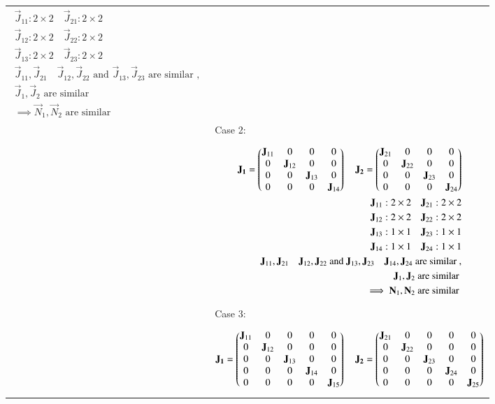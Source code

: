 \documentclass[journal,12pt]{IEEEtran}
\begin{document}
\begin{longtable}{|p{5cm}|p{13cm}|}
{\begin{align*}
    \vec{J}_{11}: 2\times2 \quad \vec{J}_{21}: 2\times2\\
    \vec{J}_{12}: 2\times2 \quad \vec{J}_{22}: 2\times2\\
    \vec{J}_{13}: 2\times2 \quad \vec{J}_{23}: 2\times2\\
    \vec{J}_{11}, \vec{J}_{21} \quad \vec{J}_{12}, \vec{J}_{22} \text{ and } \vec{J}_{13}, \vec{J}_{23} \text{ are similar }, \\
    \vec{J}_{1}, \vec{J}_{2} \text{ are similar }\\
    \implies \vec{N}_{1}, \vec{N}_{2} \text{ are similar }
\end{align*}}
\\& Case 2: 
\\&
\parbox{12cm}{\begin{align*}
    \mathbf{J_1}=\begin{pmatrix}\mathbf{J}_{11} & 0&0&0 \\ 0&\mathbf{J}_{12}&0&0\\0&0&\mathbf{J}_{13}&0\\0&0&0&\mathbf{J}_{14}\end{pmatrix} \quad \mathbf{J_2}=\begin{pmatrix}\mathbf{J}_{21} & 0&0&0 \\ 0&\mathbf{J}_{22}&0&0\\0&0&\mathbf{J}_{23}&0\\0&0&0&\mathbf{J}_{24}\end{pmatrix}\\
    \mathbf{J}_{11}: 2\times2 \quad \mathbf{J}_{21}: 2\times2\\
    \mathbf{J}_{12}: 2\times2 \quad \mathbf{J}_{22}: 2\times2\\
    \mathbf{J}_{13}: 1\times1 \quad \mathbf{J}_{23}: 1\times1\\
    \mathbf{J}_{14}: 1\times1 \quad \mathbf{J}_{24}: 1\times1\\
    \mathbf{J}_{11}, \mathbf{J}_{21}\quad \mathbf{J}_{12}, \mathbf{J}_{22}  \text{ and } \mathbf{J}_{13}, \mathbf{J}_{23} \quad \mathbf{J}_{14}, \mathbf{J}_{24} \text{ are similar }, \\
    \mathbf{J}_{1}, \mathbf{J}_{2} \text{ are similar }\\
    \implies \mathbf{N}_{1}, \mathbf{N}_{2} \text{ are similar }
\end{align*}}
\\& Case 3: 
\\&
\parbox{12cm}{\begin{align*}
    \vec{J_1}=\myvec{\vec{J}_{11} & 0&0&0&0 \\ 0&\vec{J}_{12}&0&0&0\\0&0&\vec{J}_{13}&0&0\\0&0&0&\vec{J}_{14}&0\\0&0&0&0&\vec{J}_{15}} \quad \vec{J_2}=\myvec{\vec{J}_{21} & 0&0&0&0 \\ 0&\vec{J}_{22}&0&0&0\\0&0&\vec{J}_{23}&0&0\\0&0&0&\vec{J}_{24}&0\\0&0&0&0&\vec{J}_{25}}\\

\end{align*}}
\end{longtable}
\end{document}
